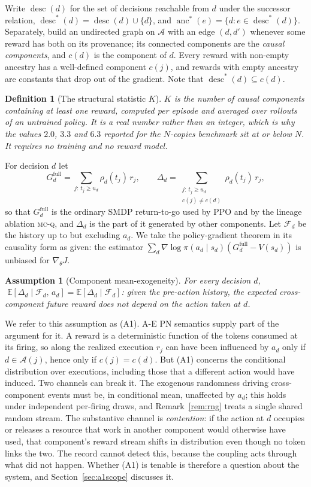\documentclass[review,authoryear,3p,times]{elsarticle}
\newtheorem{assumption}{Assumption}
\newtheorem{definition}{Definition}
\newcommand{\mcq}{\textsc{mc-q}}
\newcommand{\Fscr}{\mathcal{F}}
\newcommand{\Ascr}{\mathcal{A}}
\newcommand{\Ex}{\mathbb{E}}
\newcommand{\desc}{\operatorname{desc}}
\newcommand{\anc}{\operatorname{anc}}
\begin{document}
Write $\desc(d)$ for the set of decisions reachable from $d$ under the
successor relation, $\desc^{*}(d)=\desc(d)\cup\{d\}$, and
$\anc^{*}(e)=\{d:e\in\desc^{*}(d)\}$. Separately, build an undirected graph on
$\Ascr$ with an edge $(d,d')$ whenever some reward has both on its provenance;
its connected components are the \emph{causal components}, and $c(d)$ is the
component of $d$. Every reward with non-empty ancestry has a well-defined
component $c(j)$, and rewards with empty ancestry are constants that drop out
of the gradient. Note that $\desc^{*}(d)\subseteq c(d)$.

\begin{definition}[The structural statistic $K$]
\label{def:k}
$K$ is the number of causal components containing at least one reward,
computed per episode and averaged over rollouts of an untrained policy. It is a
real number rather than an integer, which is why the values $2.0$, $3.3$ and
$6.3$ reported for the $N$-copies benchmark sit at or below $N$. It requires no
training and no reward model.
\end{definition}

For decision $d$ let
\[
  G_d^{\mathrm{full}}=\sum_{j:\,t_j\ge u_d}\rho_d(t_j)\,r_j,
  \qquad
  \Delta_d=\sum_{\substack{j:\,t_j\ge u_d\\ c(j)\neq c(d)}}\rho_d(t_j)\,r_j ,
\]
so that $G_d^{\mathrm{full}}$ is the ordinary SMDP return-to-go used by PPO and
by the lineage ablation \mcq{}, and $\Delta_d$ is the part of it generated by
other components. Let $\Fscr_d$ be the history up to but excluding $a_d$. We
take the policy-gradient theorem in its causality form as given: the estimator
$\sum_d\nabla\log\pi(a_d\mid s_d)(G_d^{\mathrm{full}}-V(s_d))$ is unbiased for
$\nabla_\theta J$.

\begin{assumption}[Component mean-exogeneity]
\label{as:exo}
For every decision $d$,
$\;\Ex[\Delta_d \mid \Fscr_d,\,a_d] = \Ex[\Delta_d \mid \Fscr_d]$: given the
pre-action history, the expected cross-component future reward does not depend
on the action taken at $d$.
\end{assumption}

We refer to this assumption as (A1). A-E PN semantics supply part of the
argument for it. A reward is a deterministic function of the tokens consumed
at its firing, so along the realized execution $r_j$ can have been influenced
by $a_d$ only if $d\in\Ascr(j)$, hence only if $c(j)=c(d)$. But (A1) concerns
the conditional distribution over executions, including those that a different
action would have induced. Two channels can break it. The exogenous randomness
driving cross-component events must be, in conditional mean, unaffected by
$a_d$; this holds under independent per-firing draws, and Remark~\ref{rem:rng}
treats a single shared random stream. The substantive channel is
\emph{contention}: if the action at $d$ occupies or releases a resource that
work in another component would otherwise have used, that component's reward
stream shifts in distribution even though no token links the two. The record
cannot detect this, because the coupling acts through what did not happen.
Whether (A1) is tenable is therefore a question about the system, and
Section~\ref{sec:a1scope} discusses it.
\end{document}
